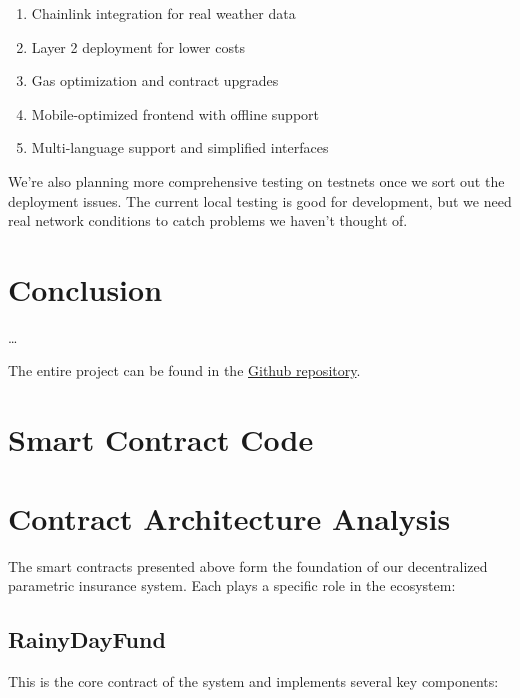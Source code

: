 \documentclass[11pt,a4paper]{article}
\begin{document}
	\begin{enumerate}
		\item Chainlink integration for real weather data
		\item Layer 2 deployment for lower costs
		\item Gas optimization and contract upgrades
		\item Mobile-optimized frontend with offline support
		\item Multi-language support and simplified interfaces
	\end{enumerate}

	We're also planning more comprehensive testing on testnets once we sort out the deployment issues.
	The current local testing is good for development, but we need real network conditions to catch problems we haven't thought of.


	\section{Conclusion}\label{sec:conclusion}
	\ldots

    The entire project can be found in the \href{https://github.com/vincentschall/decentralized_weather_insurance}{Github repository}.

	\printbibliography

	\appendix
	\section{Smart Contract Code}\label{sec:contract-code}
	

	\section{Contract Architecture Analysis}\label{sec:contract-analysis}
	The smart contracts presented above form the foundation of our decentralized parametric insurance system.
    Each plays a specific role in the ecosystem:

	\subsection{RainyDayFund}\label{subsec:analysis-rainy-day-fund}
	This is the core contract of the system and implements several key components:
\end{document}
